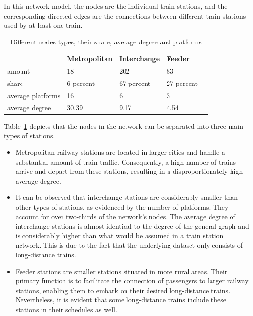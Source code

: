 \documentclass[12pt,a4paper]{article}
\newcounter{para}
\begin{document}
In this network model, the nodes are the individual train stations, and the corresponding directed edges are the connections between different train stations used by at least one train. 

\begin{table}[h]
  \centering
  \begin{tabular}{lllll}
  \hline
                 & \textbf{Metropolitan} & \textbf{Interchange} & \textbf{Feeder} &  \\ \hline
  amount         & 18                                    & 202                          & 83                              &  \\
  share     & 6 percent                             & 67 percent                   & 27 percent                      &  \\
  average platforms     & 16                            & 6                   & 3                 &  \\
  average degree & 30.39                                 & 9.17                         & 4.54                            &  \\ \hline
  \end{tabular}
  \caption{Different nodes types, their share, average degree and platforms}
   \label{fig:network-overview}
\end{table}

Table~\ref{fig:network-overview} depicts that the nodes in the network can be separated into three main types of stations.

\begin{itemize}
  \item Metropolitan railway stations are located in larger cities and handle a substantial amount of train traffic. 
  Consequently, a high number of trains arrive and depart from these stations, resulting in a disproportionately high average degree.
  \item It can be observed that interchange stations are considerably smaller than other types of stations, as evidenced by the number of platforms. They account for over two-thirds of the network's nodes. The average degree of interchange stations is almost identical to the degree of the general graph and is considerably higher than what would be assumed in a train station network. This is due to the fact that the underlying dataset only consists of long-distance trains.
  \item Feeder stations are smaller stations situated in more rural areas. Their primary function is to facilitate the connection of passengers to larger railway stations, enabling them to embark on their desired long-distance trains. Nevertheless, it is evident that some long-distance trains include these stations in their schedules as well.
\end{itemize}
\end{document}
